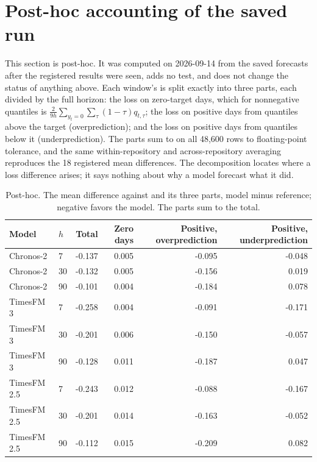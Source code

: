 \section{Post-hoc accounting of the saved run}

This section is post-hoc. It was computed on 2026-09-14 from the saved forecasts after the registered
results were seen, adds no test, and does not change the status of anything above. Each window's \qs{} is
split exactly into three parts, each divided by the full horizon: the loss on zero-target days, which for
nonnegative quantiles is $\frac{2}{9h}\sum_{y_t = 0}\sum_\tau (1-\tau) q_{t,\tau}$; the loss on positive days
from quantiles above the target (overprediction); and the loss on positive days from quantiles below it
(underprediction). The parts sum to \qs{} on all 48,600 rows to floating-point tolerance, and the same
within-repository and across-repository averaging reproduces the 18 registered mean differences. The
decomposition locates where a loss difference arises; it says nothing about why a model forecast what it did.

\begin{table}[t]
\centering\small
\caption{Post-hoc. The mean difference against \lm{} and its three parts, model minus reference; negative
favors the model. The parts sum to the total.}
\label{tab:posthoc}
\begin{tabular}{llrrrr}
\toprule
Model & $h$ & Total & Zero days & Positive, overprediction & Positive, underprediction \\
\midrule
Chronos-2 & 7 & -0.137 & 0.005 & -0.095 & -0.048 \\
Chronos-2 & 30 & -0.132 & 0.005 & -0.156 & 0.019 \\
Chronos-2 & 90 & -0.101 & 0.004 & -0.184 & 0.078 \\
TimesFM 3 & 7 & -0.258 & 0.004 & -0.091 & -0.171 \\
TimesFM 3 & 30 & -0.201 & 0.006 & -0.150 & -0.057 \\
TimesFM 3 & 90 & -0.128 & 0.011 & -0.187 & 0.047 \\
TimesFM 2.5 & 7 & -0.243 & 0.012 & -0.088 & -0.167 \\
TimesFM 2.5 & 30 & -0.201 & 0.014 & -0.163 & -0.052 \\
TimesFM 2.5 & 90 & -0.112 & 0.015 & -0.209 & 0.082 \\
\bottomrule
\end{tabular}
\end{table}

